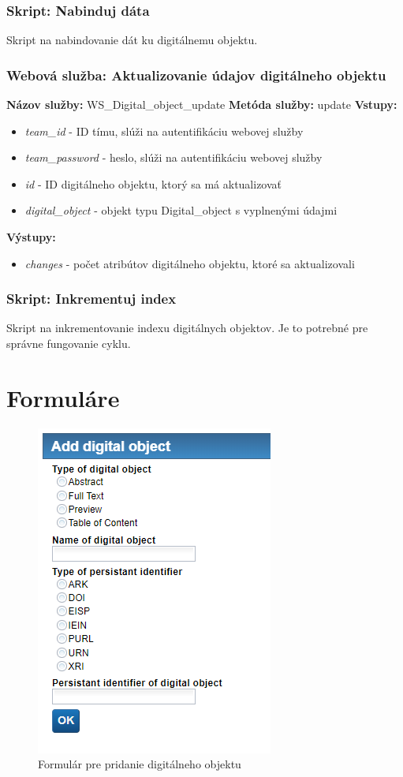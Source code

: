 \documentclass[10pt,oneside,slovak,a4paper]{article}
\begin{document}
\subsubsection{Skript: Nabinduj dáta}
Skript na nabindovanie dát ku digitálnemu objektu.

\subsubsection{Webová služba: Aktualizovanie údajov digitálneho objektu}
\textbf{Názov služby:} WS\_Digital\_object\_update
\textbf{Metóda služby:} update
\textbf{Vstupy:}
	\begin{itemize}
		\item \textit{team\_id} - ID tímu, slúži na autentifikáciu webovej služby
		\item \textit{team\_password} - heslo, slúži na autentifikáciu webovej služby
		\item \textit{id} - ID digitálneho objektu, ktorý sa má aktualizovať
		\item \textit{digital\_object} - objekt typu Digital\_object s vyplnenými údajmi
	\end{itemize}
\textbf{Výstupy:}
	\begin{itemize}
		\item \textit{changes} - počet atribútov digitálneho objektu, ktoré sa aktualizovali
	\end{itemize}
	
\subsubsection{Skript: Inkrementuj index}
Skript na inkrementovanie indexu digitálnych objektov. Je to potrebné pre správne fungovanie cyklu.

\section{Formuláre}

\begin{figure} [H]
\centering
\includegraphics[scale=0.4]{forms/Coach for Add digital object.png} 
\caption{Formulár pre pridanie digitálneho objektu}
\end{figure}
\end{document}
